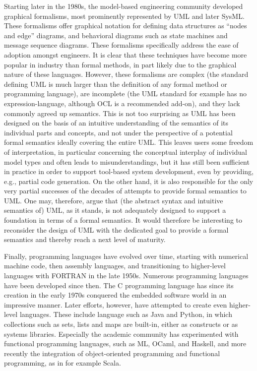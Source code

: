 Starting later in the 1980s, the model-based 
engineering community developed graphical formalisms, most 
prominently represented by UML and later SysML. These formalisms 
offer graphical notation for defining data structures as ``nodes 
and edge'' diagrams, and behavioral diagrams such as state machines 
and message sequence diagrams. These formalisms specifically 
address the ease of adoption amongst engineers. It is clear that
these techniques have become more popular in industry than formal 
methods, in part likely due to the graphical nature of 
these languages. However, these formalisms are complex (the 
standard defining UML is much larger than the definition of any 
formal method or programming language), are incomplete (the UML
standard for example has no expression-language, although OCL is
a recommended add-on), and they lack commonly agreed up semantics. 
This is not too surprising as UML has been designed on the basis of an 
intuitive understanding of the semantics of its individual parts and concepts, 
and not under the perspective of a potential formal semantics ideally covering 
the entire UML. This leaves users some freedom of interpretation, in particular 
concerning the conceptual interplay of individual model types and often leads 
to misunderstandings, but it has still been sufficient in practice in order to 
support tool-based system development, even by providing, e.g., partial code 
generation. On the other hand, it is also responsible for the only very partial 
successes of the decades of attempts to provide formal semantics to UML. One may, 
therefore, argue that (the abstract syntax and intuitive semantics of) UML, as it 
stands, is not adequately designed to support a foundation in terms of a formal 
semantics. It would therefore be interesting to reconsider the design of UML 
with the dedicated goal to provide a formal semantics and thereby reach a next 
level of maturity.

Finally, programming languages have evolved over time, starting 
with numerical machine code, then assembly languages, and 
transitioning to higher-level languages with FORTRAN in the late 
1950s. Numerous programming languages have been developed since 
then. The C programming language has  since its creation in the 
early 1970s conquered the embedded software world in an 
impressive manner. Later efforts, however, have attempted to
create even higher-level languages. These include language such as
Java and Python, in which collections such as sets, lists and maps 
are built-in, either as constructs or as systems libraries. 
Especially the academic community has experimented with functional 
programming languages, such as ML, OCaml, and Haskell, and more 
recently the integration of object-oriented programming and 
functional programming, as in for example Scala.

